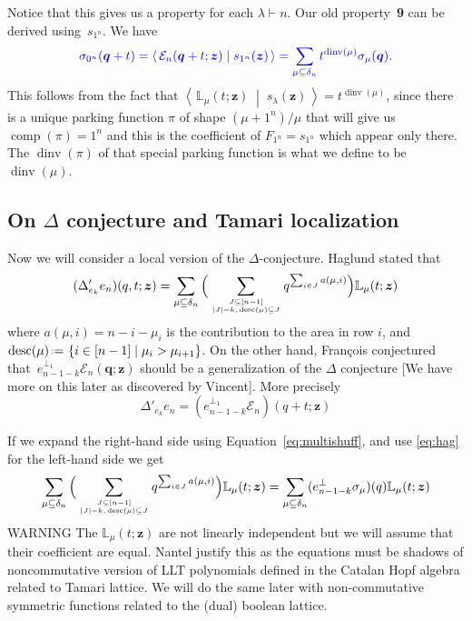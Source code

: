 \documentclass[12pt]{amsart}
\newcommand{\blue}[1]{\textcolor{blue}{#1}}
\newcommand{\green}[1]{\textcolor{green!75!black}{#1}}
\theoremstyle{plain}
\theoremstyle{definition}
\theoremstyle{remark}
\newcommand{\Qvar}{{\bm q}}
\newcommand{\Zvar}{{\bm z}}
\newcommand{\dinv}{\mathop{\mathrm{dinv}}}
\newcommand{\desc}{\mathop{\mathrm{desc}}}
\newcommand{\comp}{\mathop{\mathrm{comp}}}
\newcommand{\set}[2]{\left\{ #1 \;\middle|\; #2 \right\}} %
\newcommand{\dotprod}[2]{\left\langle \, #1 \; \middle| \; #2 \, \right\rangle} %
\newcommand{\eqdef}{\mbox{\,\raisebox{0.2ex}{\scriptsize\ensuremath{\mathrm:}}\ensuremath{=}\,}} %
\begin{document}
Notice that this gives us a property for each $\lambda\vdash n$. Our old property~{\bf 9} can be derived using~$s_{1^n}$. We have 
\begin{equation}\label{eq:alt}
\blue{
\sigma_{0^n}(\Qvar+t) =  \dotprod{{\mathcal E}_n(\Qvar+t;\Zvar)}{s_{1^n} (\Zvar)} = \sum_{\mu\subseteq \delta_n} t^{\dinv(\mu)} \sigma_\mu(\Qvar).
}
\end{equation}
This follows from the fact that $\dotprod{{\mathbb L}_\mu(t;\Zvar)}{s_\lambda(\Zvar)} = t^{\dinv(\mu)}$, since there is a unique parking function $\pi$ of shape $(\mu+1^n)/\mu$ that will give us $\comp(\pi)=1^n$ and this is the coefficient of $F_{1^n}=s_{1^n}$ which  appear only there. The $\dinv(\pi)$ of that special parking function is what we define to be $\dinv(\mu)$.

\subsection{On $\Delta$ conjecture and Tamari localization}

Now we will consider a local version of the $\Delta$-conjecture. Haglund stated that
\begin{equation}\label{eq:hag}
(\Delta'_{e_k} e_n)(q,t;\Zvar) = \sum_{\mu\subseteq\delta_n} \Big(\sum_{J\subseteq [n-1] \atop |J|=k, \, \desc(\mu)\subseteq J} q^{\sum_{i\in J} a(\mu,i)}\Big) {\mathbb L}_\mu(t;\Zvar)
\end{equation}
where $a(\mu,i)=n-i-\mu_i$ is the contribution to the area in row $i$, and~$\desc(\mu) \eqdef \set{i \in [n-1]}{\mu_i > \mu_{i+1}}$.
On the other hand, Fran\c{c}ois conjectured that~$e_{n-1-k}^{\perp_1}{\mathcal E}_n(\Qvar;\Zvar)$ should be a generalization of the $\Delta$ conjecture [\green{We have more on this later as discovered by Vincent}]. More precisely
\begin{equation}\label{eq:hag}
\Delta'_{e_k} e_n = (e_{n-1-k}^{\perp_1}{\mathcal E}_n)(q+t;\Zvar)
\end{equation}

If we expand the right-hand side using Equation~\eqref{eq:multishuff}, and use \eqref{eq:hag} for the left-hand side we get
\begin{equation}\label{eq:local}
\sum_{\mu\subseteq\delta_n} \Big(\sum_{J\subseteq [n-1] \atop |J|=k, \, \desc(\mu)\subseteq J} q^{\sum_{i\in J} a(\mu,i)}\Big) {\mathbb L}_\mu(t;\Zvar)
= \sum_{\mu\subseteq\delta_n} (e_{n-1-k}^{\perp}\sigma_{\mu})(q){\mathbb L}_{\mu}(t;\Zvar)
\end{equation}
\green{WARNING} The ${\mathbb L}_{\mu}(t;\Zvar)$ are not linearly independent but we will assume that their coefficient are equal.
Nantel justify this as the equations must be shadows of noncommutative version of LLT polynomials defined in the Catalan Hopf algebra related to Tamari lattice.
We will do the same later with non-commutative symmetric functions related to the (dual) boolean lattice.
\end{document}
